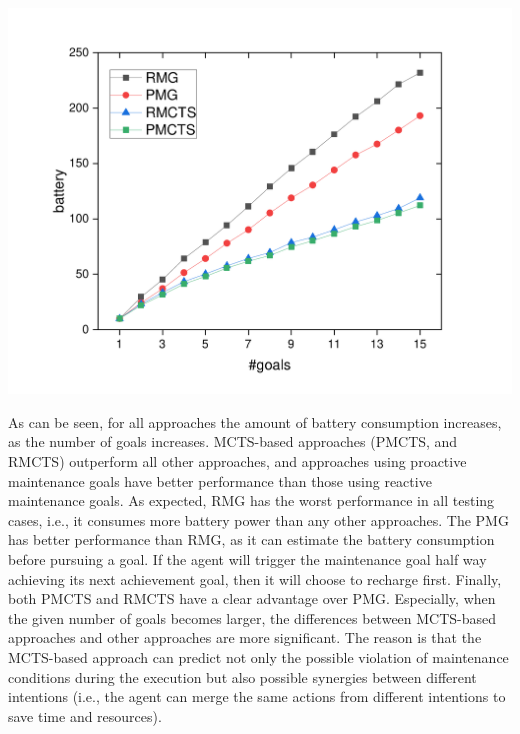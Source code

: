 \documentclass[a0,landscape]{a0poster}
\begin{document}
\begin{multicols}{4}
\begin{center}\vspace{1cm}
\includegraphics[scale=1]{./figs/gX_cY_fixCap40.pdf}
\label{fig:static1}
\end{center}\vspace{1cm}

As can be seen, for all approaches the amount of battery consumption increases, as the number of goals increases.
MCTS-based approaches (PMCTS, and RMCTS) outperform all other approaches, and approaches using proactive maintenance goals have better performance than those using reactive maintenance goals.
As expected, RMG has the worst performance in all testing cases, i.e., it consumes more battery power than any other approaches.
The PMG has better performance than RMG, as it can estimate the battery consumption before pursuing a goal. If the agent will trigger the maintenance goal half way achieving its next achievement goal, then it will choose to recharge first.
Finally, both PMCTS and RMCTS have a clear advantage over PMG. Especially, when the given number of goals becomes larger, the differences between MCTS-based approaches and other approaches are more significant. The reason is that the MCTS-based approach can predict not only the possible violation of maintenance conditions during the execution but also possible synergies between different intentions (i.e., the agent can merge the same actions from different intentions to save time and resources).


\end{multicols}
\end{document}
